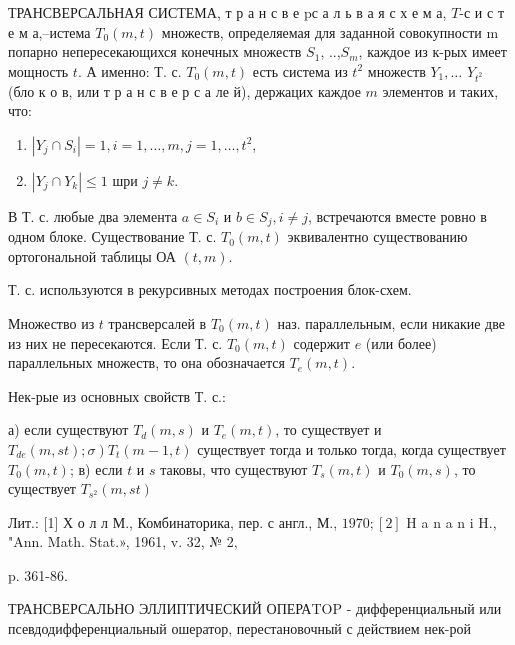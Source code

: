 \documentclass[10pt]{article}
\begin{document}
ТРАНСВЕРСАЛЬНАЯ СИСТЕМА, т р а н с в е pс а л ь в а я с х е м а, $T$-с и с т е м а,--истема $T_{0}(m, t)$ множеств, определяемая для заданной совокупности $\mathrm{m}$ попарно непересекающихся конечных множеств $S_{1}$, ..,$S_{m}$, каждое из к-рых имеет мощность $t$. А именно: Т. с. $T_{0}(m, t)$ есть система из $t^{2}$ множеств $Y_{1}, \ldots$ $Y_{t^{2}}$ (бло к о в, или т р а н с в е р с а ле й), держацих каждое $m$ элементов и таких, что:



\begin{enumerate}

  \item $\left|Y_{j} \cap S_{i}\right|=1, i=1, \ldots, m, j=1, \ldots, t^{2}$,



  \item $\left|Y_{j} \cap Y_{k}\right| \leqslant 1$ шри $j \neq k$.



\end{enumerate}



В Т. с. любые два элемента $a \in S_{i}$ и $b \in S_{j}, i \neq j$, встречаются вместе ровно в одном блоке. Существование Т. с. $T_{0}(m, t)$ эквивалентно существованию ортогональной таблицы ОА $(t, m)$.



Т. с. используются в рекурсивных методах построения блок-схем.



Множество из $t$ трансверсалей в $T_{0}(m, t)$ наз. параллельным, если никакие две из них не пересекаются. Если Т. с. $T_{0}(m, t)$ содержит $e$ (или более) параллельных множеств, то она обозначается $T_{e}(m, t)$.



Нек-рые из основных свойств Т. с.:



а) если существуют $T_{d}(m, s)$ и $T_{e}(m, t)$, то существует и $\left.T_{d e}(m, s t) ; \sigma\right) T_{t}(m-1, t)$ существует тогда и только тогда, когда существует $T_{0}(m, t)$; в) если $t$ и $s$ таковы, что существуют $T_{s}(m, t)$ и $T_{0}(m, s)$, то существует $T_{s^{2}}(m, s t)$



Лит.: [1] Х о л л М., Комбинаторика, пер. с англ., М., $1970 ;[2]$ H a n a n i H., "Ann. Math. Stat.», 1961, v. 32, № 2,

p. 361-86.



ТРАНСВЕРСАЛЬНО ЭЛЛИПТИЧЕСКИЙ ОПЕРАTOP - дифференциальный или псевдодифференциальный ошератор, перестановочный с действием нек-рой
\end{document}
